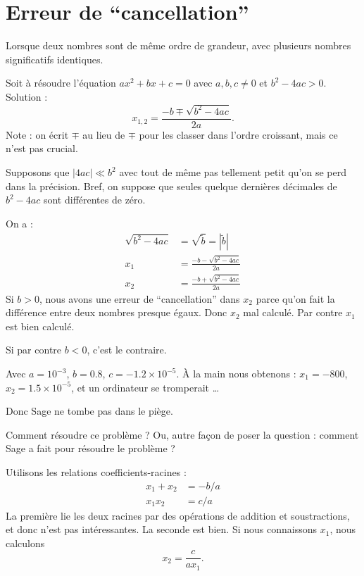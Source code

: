 \section{Erreur de ``cancellation''}

Lorsque deux nombres sont de même ordre de grandeur, avec plusieurs nombres significatifs identiques.

\begin{example}
	Soit à résoudre l'équation \( ax^2+bx+c=0\) avec \( a,b,c\neq 0\) et \( b^2-4ac>0\). Solution :
	\begin{equation}
		x_{1,2}=\frac{ -b\mp\sqrt{b^2-4ac} }{ 2a }.
	\end{equation}
	Note : on écrit \( \mp\) au lieu de \( \mp\) pour les classer dans l'ordre croissant, mais ce n'est pas crucial.

	Supposons que \( | 4ac |\ll b^2\) avec tout de même pas tellement petit qu'on se perd dans la précision. Bref, on suppose que seules quelque dernières décimales de \( b^2-4ac\) sont différentes de zéro.

	On a :
	\begin{subequations}
		\begin{align}
			\sqrt{b^2-4ac}&=\sqrt{\tilde b}= | \tilde b | \\
			x_1&=\frac{ -b-\sqrt{b^2-4ac} }{ 2a }\\
			x_2&=\frac{ -b+\sqrt{b^2-4ac} }{ 2a }
		\end{align}
	\end{subequations}
	Si \( b>0\), nous avons une erreur de ``cancellation'' dans \( x_2\) parce qu'on fait la différence entre deux nombres presque égaux. Donc \( x_2\) mal calculé. Par contre \( x_1\) est bien calculé.

	Si par contre \( b<0\), c'est le contraire.


	Avec \( a=10^{-3}\), \( b=0.8\), \( c=-1.2\times 10^{-5}\). À la main nous obtenons : \( x_1=-800\), \( x_2=1.5\times 10^{-5}\), et un ordinateur se tromperait \ldots




	Donc Sage ne tombe pas dans le piège.
\end{example}

Comment résoudre ce problème ? Ou, autre façon de poser la question : comment Sage a fait pour résoudre le problème ?

Utilisons les relations coefficients-racines :
\begin{subequations}
	\begin{align}
		x_1+x_2&=-b/a\\
		x_1x_2&=c/a
	\end{align}
\end{subequations}
La première lie les deux racines par des opérations de addition et soustractions, et donc n'est pas intéressantes. La seconde est bien. Si nous connaissons \( x_1\), nous calculons
\begin{equation}
	x_2=\frac{ c }{ ax_1 }.
\end{equation}

